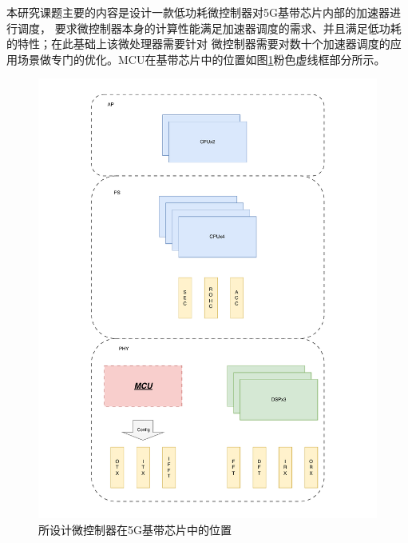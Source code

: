 \documentclass[a4paper, 12pt]{article}
\begin{document}
本研究课题主要的内容是设计一款低功耗微控制器对5G基带芯片内部的加速器进行调度，
要求微控制器本身的计算性能满足加速器调度的需求、并且满足低功耗的特性；在此基础上该微处理器需要针对
微控制器需要对数十个加速器调度的应用场景做专门的优化。MCU在基带芯片中的位置如图\ref{fig:pic1}粉色虚线框部分所示。
\begin{figure}[htbp]
  \centering
  \includegraphics[scale=0.5]{./images/mcu_location.pdf}
  \caption{所设计微控制器在5G基带芯片中的位置}
  \label{fig:pic1}
\end{figure}

\clearpage
\end{document}
